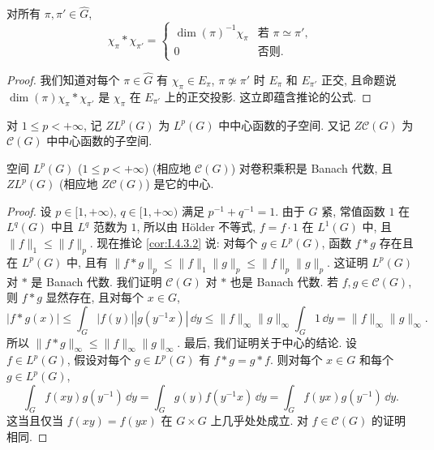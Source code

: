 \begin{corollary}[特征标的卷积]
\label{cor:IV.7.2}
对所有 $\pi, \pi' \in \widehat{G}$,
\[
\chi_{\pi} * \chi_{\pi'} = \begin{cases} \dim(\pi)^{-1}\chi_{\pi} & \text{若 } \pi \simeq \pi', \\ 0 & \text{否则}. \end{cases}
\]
\end{corollary}

\begin{proof}
我们知道对每个 $\pi \in \widehat{G}$ 有 $\chi_{\pi} \in E_{\pi}$, $\pi \not\simeq \pi'$ 时 $E_{\pi}$ 和 $E_{\pi'}$ 正交, 且命题说 $\dim(\pi)\chi_{\pi} * \chi_{\pi'}$ 是 $\chi_{\pi}$ 在 $E_{\pi'}$ 上的正交投影. 这立即蕴含推论的公式.
\end{proof}

\begin{definition}[中心函数空间]
\label{def:IV.7.3}
对 $1 \leq p < +\infty$, 记 $ZL^p(G)$ 为 $L^p(G)$ 中中心函数的子空间. 又记 $Z\mathcal{C}(G)$ 为 $\mathcal{C}(G)$ 中中心函数的子空间.
\end{definition}

\begin{proposition}[$L^p$ 的中心]
\label{prop:IV.7.4}
空间 $L^p(G)$ ($1 \leq p < +\infty$) (相应地 $\mathcal{C}(G)$) 对卷积乘积是 Banach 代数, 且 $ZL^p(G)$ (相应地 $Z\mathcal{C}(G)$) 是它的中心.
\end{proposition}

\begin{proof}
设 $p \in [1, +\infty)$, $q \in [1, +\infty)$ 满足 $p^{-1} + q^{-1} = 1$. 由于 $G$ 紧, 常值函数 $1$ 在 $L^q(G)$ 中且 $L^q$ 范数为 $1$, 所以由 H\"older 不等式, $f = f \cdot 1$ 在 $L^1(G)$ 中, 且 $\|f\|_1 \leq \|f\|_p$. 现在推论 \ref{cor:I.4.3.2} 说: 对每个 $g \in L^p(G)$, 函数 $f * g$ 存在且在 $L^p(G)$ 中, 且有 $\|f * g\|_p \leq \|f\|_1\|g\|_p \leq \|f\|_p\|g\|_p$. 这证明 $L^p(G)$ 对 $*$ 是 Banach 代数.
我们证明 $\mathcal{C}(G)$ 对 $*$ 也是 Banach 代数. 若 $f, g \in \mathcal{C}(G)$, 则 $f * g$ 显然存在, 且对每个 $x \in G$,
\[
|f * g(x)| \leq \int_G |f(y)||g(y^{-1}x)|\,\dd y \leq \|f\|_{\infty}\|g\|_{\infty}\int_G 1\,\dd y = \|f\|_{\infty}\|g\|_{\infty}.
\]
所以 $\|f * g\|_{\infty} \leq \|f\|_{\infty}\|g\|_{\infty}$.
最后, 我们证明关于中心的结论. 设 $f \in L^p(G)$, 假设对每个 $g \in L^p(G)$ 有 $f * g = g * f$. 则对每个 $x \in G$ 和每个 $g \in L^p(G)$,
\[
\int_G f(xy)g(y^{-1})\,\dd y = \int_G g(y)f(y^{-1}x)\,\dd y = \int_G f(yx)g(y^{-1})\,\dd y.
\]
这当且仅当 $f(xy) = f(yx)$ 在 $G \times G$ 上几乎处处成立. 对 $f \in \mathcal{C}(G)$ 的证明相同.
\end{proof}

